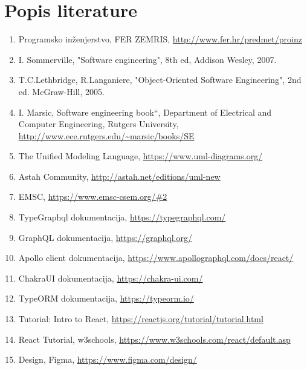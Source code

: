 \chapter*{Popis literature}
		\begin{enumerate}
			
			
			\item  Programsko inženjerstvo, FER ZEMRIS, \url{http://www.fer.hr/predmet/proinz}
			
			\item  I. Sommerville, "Software engineering", 8th ed, Addison Wesley, 2007.
			
			\item  T.C.Lethbridge, R.Langaniere, "Object-Oriented Software Engineering", 2nd ed. McGraw-Hill, 2005.
			
			\item  I. Marsic, Software engineering book``, Department of Electrical and Computer Engineering, Rutgers University, \url{http://www.ece.rutgers.edu/~marsic/books/SE}
			
			\item  The Unified Modeling Language, \url{https://www.uml-diagrams.org/}
			
			\item  Astah Community, \url{http://astah.net/editions/uml-new}
			
			\item EMSC, \url{https://www.emsc-csem.org/#2}
			
			\item TypeGraphql dokumentacija, \url{https://typegraphql.com/}

            \item GraphQL dokumentacija, \url{https://graphql.org/}

            \item Apollo client dokumentacija, \url{https://www.apollographql.com/docs/react/}

            \item ChakraUI dokumentacija, \url{https://chakra-ui.com/}

            \item TypeORM dokumentacija, \url{https://typeorm.io/}
            
            \item Tutorial: Intro to React, \url{https://reactjs.org/tutorial/tutorial.html}
            
            \item React Tutorial, w3schools,  \url{https://www.w3schools.com/react/default.asp}
            
            \item Design, Figma, \url{https://www.figma.com/design/}

		\end{enumerate}
		
		 
